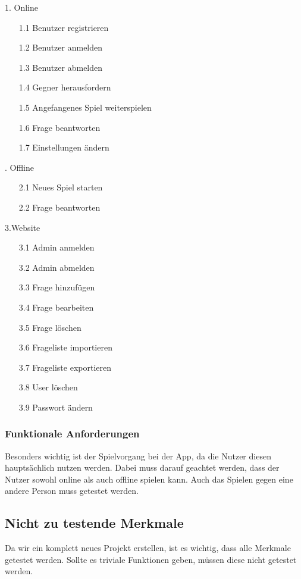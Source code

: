 \documentclass[fontsize=12pt,paper=a4,twoside]{scrartcl}
\begin{document}
1. Online\\
\begin{itemize}
\item[1.1]Benutzer registrieren
\item[1.2]Benutzer anmelden 
\item[1.3]Benutzer abmelden 
\item[1.4]Gegner herausfordern
\item[1.5]Angefangenes Spiel weiterspielen
\item[1.6]Frage beantworten 
\item[1.7]Einstellungen ändern
\end{itemize}
. Offline\\
\begin{itemize}
\item[2.1]Neues Spiel starten
\item[2.2]Frage beantworten
\end{itemize}
\bigskip
3.Website\\
\begin{itemize}
\item[3.1]Admin anmelden
\item[3.2]Admin abmelden
\item[3.3]Frage hinzufügen
\item[3.4]Frage bearbeiten
\item[3.5]Frage löschen
\item[3.6]Frageliste importieren
\item[3.7]Frageliste exportieren
\item[3.8]User löschen
\item[3.9]Passwort ändern
\end{itemize}
\bigskip


\subsubsection{Funktionale Anforderungen} 
Besonders wichtig ist der Spielvorgang bei der App, da die Nutzer diesen hauptsächlich nutzen werden. Dabei muss darauf geachtet werden, dass der Nutzer sowohl online als auch offline spielen kann. Auch das Spielen gegen eine andere Person muss getestet werden.\\

\subsection{Nicht zu testende Merkmale}\label{c05}
Da wir ein komplett neues Projekt erstellen, ist es wichtig, dass alle Merkmale getestet werden. Sollte es triviale Funktionen geben, müssen diese nicht getestet werden.
\end{document}
